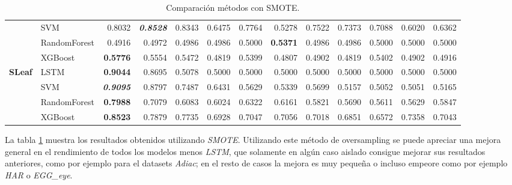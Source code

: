 \begin{table}[H]
\begin{adjustbox}{max width=14cm}
\begin{tabular}{|c|l|r|r|r|r|r|r|r|r|r|r|r|}
			                      & SVM          & 0.8032                   & \textit{\textbf{0.8528}} & 0.8343          & 0.6475 & 0.7764          & 0.5278                   & 0.7522                   & 0.7373                   & 0.7088 & 0.6020                   & 0.6362          \\
			                      & RandomForest & 0.4916                   & 0.4972                   & 0.4986          & 0.4986 & 0.5000          & \textbf{0.5371}          & 0.4986                   & 0.4986                   & 0.5000 & 0.5000                   & 0.5000          \\
			                      & XGBoost      & \textbf{0.5776}          & 0.5554                   & 0.5472          & 0.4819 & 0.5399          & 0.4807                   & 0.4902                   & 0.4819                   & 0.5402 & 0.4902                   & 0.4916          \\
			\hline
			\textbf{SLeaf}        & LSTM         & \textbf{0.9044}          & 0.8695                   & 0.5078          & 0.5000 & 0.5000          & 0.5000                   & 0.5000                   & 0.5000                   & 0.5000 & 0.5000                   & 0.5000          \\
			                      & SVM          & \textit{\textbf{0.9095}} & 0.8797                   & 0.7487          & 0.6431 & 0.5629          & 0.5339                   & 0.5699                   & 0.5157                   & 0.5052 & 0.5051                   & 0.5165          \\
			                      & RandomForest & \textbf{0.7988}          & 0.7079                   & 0.6083          & 0.6024 & 0.6322          & 0.6161                   & 0.5821                   & 0.5690                   & 0.5611 & 0.5629                   & 0.5847          \\
			                      & XGBoost      & \textbf{0.8523}          & 0.7879                   & 0.7735          & 0.6928 & 0.7047          & 0.7056                   & 0.7018                   & 0.6851                   & 0.6572 & 0.7358                   & 0.7043          \\
			\hline
		\end{tabular}
	\end{adjustbox}
	\caption{Comparación métodos con SMOTE.}
	\label{tab:all_comp_smote}
\end{table}

La tabla \ref{tab:all_comp_smote} muestra los resultados obtenidos utilizando \textit{SMOTE}. Utilizando este método de oversampling se puede apreciar una mejora general en el rendimiento de todos los modelos menos \textit{LSTM}, que solamente en algún caso aislado consigue mejorar sus resultados anteriores, como por ejemplo para el datasets \textit{Adiac}; en el resto de casos la mejora es muy pequeña o incluso empeore como por ejemplo \textit{HAR} o \textit{EGG\_eye}.\newline
\newpage

